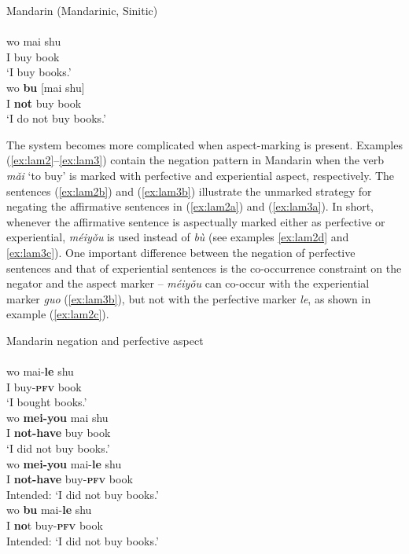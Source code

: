 \documentclass[output=paper,colorlinks,citecolor=brown,chinesefont]{langscibook}
\begin{document}
\ea Mandarin (Mandarinic, Sinitic) \label{ex:lam1}\\ 
   \label{ex:lam1a}\\
    \gll wo mai	shu \\
         I	buy	book\\
    \glt `I buy books.'
   \label{ex:lam1b}\\
    \gll wo \textbf{bu} [mai shu]\\
    	I \textbf{not} buy book\\
    \glt `I do not buy books.'
\z \z

The system becomes more complicated when aspect-marking is present. Examples (\ref{ex:lam2}--\ref{ex:lam3}) contain the negation pattern in Mandarin when the verb \textit{mǎi} `to buy' is marked with perfective and experiential aspect, respectively. The sentences (\ref{ex:lam2b}) and (\ref{ex:lam3b}) illustrate the unmarked strategy for negating the affirmative sentences in (\ref{ex:lam2a}) and (\ref{ex:lam3a}). In short, whenever the affirmative sentence is aspectually marked either as perfective or experiential, \textit{méiyǒu} is used instead of \textit{bù} (see examples \ref{ex:lam2d} and \ref{ex:lam3c}). One important difference between the negation of perfective sentences and that of experiential sentences is the co-occurrence constraint on the negator and the aspect marker – \textit{méiyǒu} can co-occur with the experiential marker \textit{guo} (\ref{ex:lam3b}), but not with the perfective marker \textit{le}, as shown in example (\ref{ex:lam2c}). 

\ea Mandarin negation and perfective aspect \label{ex:lam2}\\
   \label{ex:lam2a}\\
    \gll wo	mai-\textbf{le} shu \\
    I buy-\textbf{\textsc{pfv}} book\\
    \glt `I bought books.'
   \label{ex:lam2b}\\
    \gll wo	\textbf{mei-you} mai shu \\
    I \textbf{not-have} buy book\\
    \glt `I did not buy books.'
   \label{ex:lam2c}\\
  	\gll *wo	 \textbf{mei-you} mai-\textbf{le} shu\\
  	I \textbf{not-have} buy-\textbf{\textsc{pfv}} book\\
  	\glt Intended: `I did not buy books.'
   \label{ex:lam2d}\\
  	\gll *wo	 \textbf{bu} mai-\textbf{le} shu \\
  	I \textbf{no}t buy-\textbf{\textsc{pfv}} book\\
  	\glt Intended: `I did not buy books.'
\z \z
\end{document}
